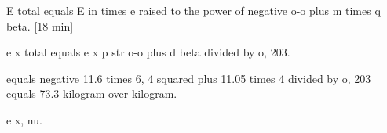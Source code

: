 E total equals E in times e raised to the power of negative o-o plus m times q beta. [18 min]

e x total equals e x p str o-o plus d beta divided by o, 203.

equals negative 11.6 times 6, 4 squared plus 11.05 times 4 divided by o, 203 equals 73.3 kilogram over kilogram.

e x, nu.